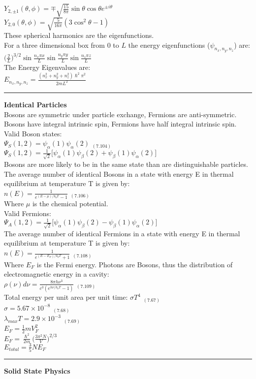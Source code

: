 \documentclass[0pt]{report}
\begin{document}
\begin{multicols*}{3}
\begin{flushleft}
$Y_{2,\pm 1}(\theta,\phi)=\mp \sqrt{\frac{15}{8\pi}}\sin\theta\cos\theta e^{\pm i\theta}$\\
$Y_{2,0}(\theta,\phi)=\sqrt{\frac{5}{16\pi}}(3\cos^2\theta-1)$\\
These spherical harmonics are the eigenfunctions.\\
For a three dimensional box from $0$ to $L$ the energy eigenfunctions ($\psi_{n_x,n_y,n_z}$) are:\\
$\Big(\frac{2}{L}\Big)^{3/2}\sin\frac{n_x\pi x}{L}\sin\frac{n_y\pi y}{L}\sin\frac{n_z\pi z}{L}$\\
The Energy Eigenvalues are:\\
$E_{n_x,n_y,n_z}=\frac{(n_x^2+n_y^2+n_z^2)\hslash^2\pi^2}{2mL^2}$\\

\noindent\rule[0.5ex]{\linewidth}{1pt}
\textbf{Identical Particles}\\


Bosons are symmetric under particle exchange, Fermions are anti-symmetric. Bosons have integral intrinsic spin, Fermions have half integral intrinsic spin.\\
Valid Boson states:\\
$\Psi_S(1,2)=\psi_{\alpha}(1)\psi_{\alpha}(2)$ $_{(7.104)}$\\
$\Psi_S(1,2)=\frac{1}{\sqrt{2}}\big[\psi_{\alpha}(1)\psi_{\beta}(2)+\psi_{\beta}(1)\psi_{\alpha}(2)\big]$\\
Bosons are more likely to be in the same state than are distinguishable particles.
The average number of identical Bosons in a state with energy E in thermal equilibrium at temperature T is given by:\\
$n(E)=\frac{1}{e^{(E-\mu)/k_bT}-1}$ $_{(7.106)}$\\
Where $\mu$ is the chemical potential.\\
Valid Fermions:\\
$\Psi_A(1,2)=\frac{1}{\sqrt{2}}\big[\psi_{\alpha}(1)\psi_{\beta}(2)-\psi_{\beta}(1)\psi_{\alpha}(2)\big]$\\
The average number of identical Fermions in a state with energy E in thermal equilibrium at temperature T is given by:\\
$n(E)=\frac{1}{e^{(E-E_F)/k_bT}+1}$ $_{(7.108)}$\\
Where $E_F$ is the Fermi energy.
Photons are Bosons, thus the distribution of electromagnetic energy in a cavity:\\
$\rho(\nu)d\nu=\frac{8\pi h\nu^3}{c^3(e^{h\nu/k_b T}-1)}$ $_{(7.109)}$\\
Total energy per unit area per unit time:
$\sigma T^4$ $_{(7.67)}$\\
$\sigma=5.67\times10^{-8}$ $_{(7.68)}$\\
$\lambda_{max}T=2.9\times10^{-3}$ $_{(7.69)}$\\
$E_F=\frac{1}{2}mV_F^2$\\
$E_F=\frac{\hslash^2}{2m}\Big(\frac{3\pi^2N}{V}\Big)^{2/3}$\\
$E_{total}=\frac{3}{5}NE_F$\\
\noindent\rule[0.5ex]{\linewidth}{1pt}
\textbf{Solid State Physics}\\



\end{flushleft}
\end{multicols*}
\end{document}
